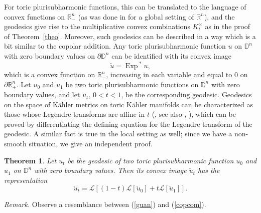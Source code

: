 \documentclass[12pt]{article}
\newcommand{\beq}{\begin{equation}}
\newcommand{\eeq}{\end{equation}}
\numberwithin{equation}{section}
\newtheorem{theorem}{Theorem}[section]
\newcommand{\Exp}{{\operatorname{Exp}\,}}
\newcommand{\D}{{\mathbb D}}
\newcommand{\Rn}{{\mathbb R}^n}
\newcommand{\Rnm}{{\mathbb R}_-^n}
\newcommand{\Rnp}{{\mathbb R}_+^n}
\newcommand{\cL}{{\mathcal  L}}
\begin{document}
For toric plurisubharmonic functions, this can be translated to the language of convex functions on $\Rnm$ (as was done in \cite{BB} for a global setting of $\Rn$), and the geodesics give rise to the multiplicative convex combinations $K_t^\times$ as in the proof of Theorem~\ref{theo}. Moreover, such geodesics can be described in a way which is a bit similar to the copolar addition. Any toric plurisubharmonic function $u$ on $\D^n$ with zero boundary values on $\partial\D^n$ can be identified with its convex image
$$\check u=\Exp^* u,$$ which is a convex function on $\Rnm$, increasing in each variable and equal to $0$ on $\partial\Rnp$.
Let $u_0$ and $u_1$ be two toric plurisubharmonic functions on $\D^n$ with zero boundary values,
 and let $u_t$, $0<t<1$, be the corresponding geodesic. Geodesics on the space of K\"{a}hler metrics on toric K\"{a}hler manifolds can be characterized as those whose Legendre transforms are affine in $t$ (\cite{Gu}, see also \cite{BB}, \cite{G15}), which can be proved by differentiating the defining equation for the Legendre transform of the geodesic. A similar fact is true in the local setting as well; since we have a non-smooth situation, we give an independent proof.

\begin{theorem}\label{guan1}  Let $u_t$ be the geodesic of two toric plurisubharmonic function $u_0$ and $u_1$ on $\D^n$ with zero boundary values. Then its convex image $\check u_t$ has the representation
 \beq\label{guan}\check u_t =\cL\left[ (1-t)\cL[\check u_0] + t\cL[\check u_1]\right].
 \eeq
 \end{theorem}

{\it Remark.} Observe a resemblance between (\ref{guan}) and  (\ref{copcom}).
\end{document}
